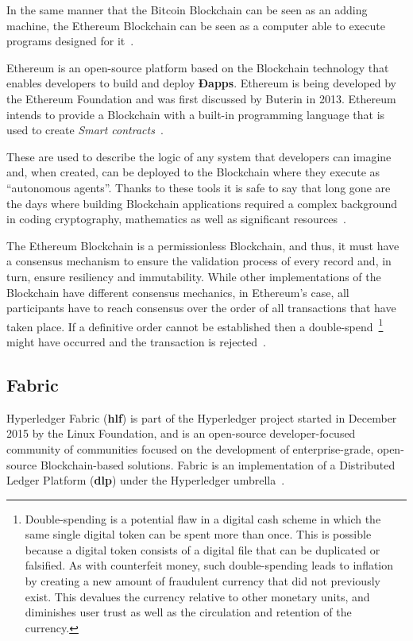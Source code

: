 In the same manner that the Bitcoin Blockchain can be seen as an adding
machine, the Ethereum Blockchain can be seen as a computer able to execute
programs designed for it~\cite{Wood2015}.

Ethereum is an open-source platform based on the Blockchain technology that
enables developers to build and deploy \textbf{Ðapps}. Ethereum is being
developed by the Ethereum Foundation and was first discussed by Buterin in
2013.  Ethereum intends to provide a Blockchain with a built-in programming
language that is used to create \textit{Smart contracts}~\cite{Wood2017}.

These are used to describe the logic of any system that developers can imagine
and, when created, can be deployed to the Blockchain where they execute as
“autonomous agents”.  Thanks to these tools it is safe to say that long gone
are the days where building Blockchain applications required a complex
background in coding cryptography, mathematics as well as significant
resources~\cite{Wood2017,BlockGeeks2017}.

The Ethereum Blockchain is a permissionless Blockchain, and thus, it must have
a consensus mechanism to ensure the validation process of every record and, in
turn, ensure resiliency and immutability. While other implementations of the
Blockchain have different consensus mechanics, in Ethereum’s case, all
participants have to reach consensus over the order of all transactions that
have taken place. If a definitive order cannot be established then a
double-spend~\footnote{Double-spending is a potential flaw in a digital cash
scheme in which the same single digital token can be spent more than once.
This is possible because a digital token consists of a digital file that can be
duplicated or falsified. As with counterfeit money, such double-spending leads
to inflation by creating a new amount of fraudulent currency that did not
previously exist. This devalues the currency relative to other monetary units,
and diminishes user trust as well as the circulation and retention of the
currency.} might have occurred and the transaction is rejected~\cite{Wood2017}.

\subsection{Fabric}

Hyperledger Fabric (\textbf{hlf}) is part of the Hyperledger project started in
December 2015 by the Linux Foundation, and is an open-source developer-focused
community of communities focused on the development of enterprise-grade,
open-source Blockchain-based solutions.  Fabric is an implementation of a
Distributed Ledger Platform (\textbf{dlp}) under the Hyperledger
umbrella~\cite{Cachin2016}.


